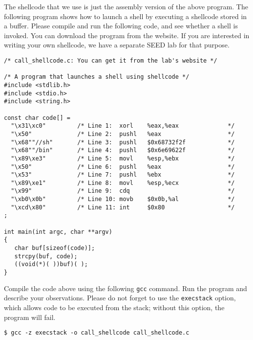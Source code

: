 The shellcode that we use is just the assembly version of the above program. The following
program shows how to launch a shell by executing a shellcode stored in a buffer. Please
compile and run the following code, and see whether a shell is invoked. You can download
the program from the website. If you are interested in writing your own shellcode, 
we have a separate SEED lab for that purpose. 


\begin{lstlisting}
/* call_shellcode.c: You can get it from the lab's website */

/* A program that launches a shell using shellcode */
#include <stdlib.h>
#include <stdio.h>
#include <string.h>

const char code[] =
  "\x31\xc0"         /* Line 1:  xorl    %eax,%eax              */
  "\x50"             /* Line 2:  pushl   %eax                   */
  "\x68""//sh"       /* Line 3:  pushl   $0x68732f2f            */
  "\x68""/bin"       /* Line 4:  pushl   $0x6e69622f            */
  "\x89\xe3"         /* Line 5:  movl    %esp,%ebx              */
  "\x50"             /* Line 6:  pushl   %eax                   */
  "\x53"             /* Line 7:  pushl   %ebx                   */
  "\x89\xe1"         /* Line 8:  movl    %esp,%ecx              */
  "\x99"             /* Line 9:  cdq                            */
  "\xb0\x0b"         /* Line 10: movb    $0x0b,%al              */
  "\xcd\x80"         /* Line 11: int     $0x80                  */
;

int main(int argc, char **argv)
{
   char buf[sizeof(code)];
   strcpy(buf, code);
   ((void(*)( ))buf)( );
} 
\end{lstlisting}
 

Compile the code above using the following \texttt{gcc} command. Run the program
and describe your observations. 
Please do not forget to use the {\tt execstack} option, which allows 
code to be executed from the stack; without this option, the program will fail.


\begin{lstlisting}
$ gcc -z execstack -o call_shellcode call_shellcode.c
\end{lstlisting}



